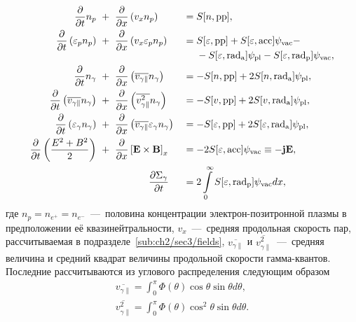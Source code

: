 \begin{alignat}{3}
    \label{eq:ch2/hd_p1}
    \pdv{}{t}n_p  \ &+ \  \pdv{}{x}\left( v_x n_p \right) && =  S[n, \mathrm{pp}] ,\\
    \label{eq:ch2/hd_p2}
    \pdv{}{t}\left( \varepsilon_p n_p \right)   \ &+\  \pdv{}{x}\left( v_x \varepsilon_p n_p \right) && =
    \begin{aligned}[t]
        & S[\varepsilon, \mathrm{pp}] + S[\varepsilon, \mathrm{\mathrm{acc}}] \psi_\mathrm{vac} - \\
        & - S[\varepsilon, \mathrm{rad_a}] \psi_\mathrm{pl} - S[\varepsilon, \mathrm{rad_p}] \psi_\mathrm{vac} ,
    \end{aligned} \\
    \label{eq:ch2/hd_g1}
    \pdv{}{t}n_\gamma  \ &+\ \pdv{}{x}\left( \overline{v_{\gamma\parallel}} n_\gamma \right)&& = -S[n, \mathrm{pp}] + 2 S[n, \mathrm{rad_a}] \psi_\mathrm{pl} ,\\
    \label{eq:ch2/hd_g2}
    \pdv{}{t}\left( \overline{v_{\gamma\parallel}} n_\gamma \right) \ &+\ \pdv{}{x}\left( \overline{v_{\gamma\parallel}^2} n_\gamma \right) && =  -S[v, \mathrm{pp}] + 2 S[v, \mathrm{rad_a}] \psi_\mathrm{pl} ,\\
    \label{eq:ch2/hd_g3}
    \pdv{}{t}\left( \varepsilon_\gamma n_\gamma \right) \ &+\ \pdv{}{x}\left( \overline{v_{\gamma\parallel}} \varepsilon_\gamma n_\gamma \right) && = -S[\varepsilon, \mathrm{pp}] + 2 S[\varepsilon, \mathrm{rad_a}] \psi_\mathrm{pl} ,\\
    \label{eq:ch2/hd_e1}
    \pdv{}{t}\left( \frac{E^2 + B^2}{2} \right) \ &+\ \pdv{}{x} \left[ \vb{E\times B} \right]_x && = - 2 S[\varepsilon, \mathrm{\mathrm{acc}}]\psi_\mathrm{vac} \equiv - \vb{jE} ,\\
    {}& \qquad \qquad \quad \pdv{\Sigma_\gamma}{t} && = 2 \int\limits_0^\infty S[\varepsilon, \mathrm{rad_p}]\psi_\mathrm{vac} dx ,
\end{alignat}
где $n_p = n_{e^+} = n_{e^-}$~---~половина концентрации электрон-позитронной плазмы в предположении её квазинейтральности, $v_x$~---~средняя продольная скорость пар, рассчитываемая в подразделе~\ref{sub:ch2/sec3/fields}, $\overline{v_{\gamma\parallel}}$ и $\overline{v_{\gamma\parallel}^2}$~---~средняя величина и средний квадрат величины продольной скорости гамма-квантов.
Последние рассчитываются из углового распределения следующим образом
\begin{align}
    \overline{v_{\gamma\parallel}} = \int_0^\pi \Phi(\theta)\cos\theta\sin\theta d\theta, \\
    \overline{v_{\gamma\parallel}^2} = \int_0^\pi \Phi(\theta)\cos^2\theta\sin\theta d\theta.
\end{align}
